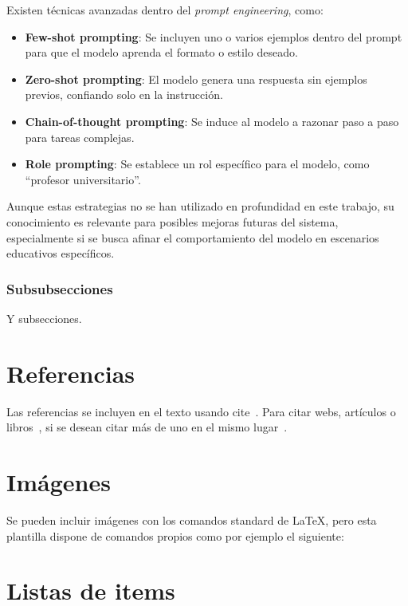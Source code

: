 Existen técnicas avanzadas dentro del \textit{prompt engineering}, como:

\begin{itemize}
    \item \textbf{Few-shot prompting}: Se incluyen uno o varios ejemplos dentro del prompt para 
	que el modelo aprenda el formato o estilo deseado.
    \item \textbf{Zero-shot prompting}: El modelo genera una respuesta sin ejemplos previos, 
	confiando solo en la instrucción.
    \item \textbf{Chain-of-thought prompting}: Se induce al modelo a razonar paso a paso para 
	tareas complejas.
    \item \textbf{Role prompting}: Se establece un rol específico para el modelo, como ``profesor universitario''.
\end{itemize}

Aunque estas estrategias no se han utilizado en profundidad en este trabajo, su conocimiento es relevante 
para posibles mejoras futuras del sistema, especialmente si se busca afinar el comportamiento del 
modelo en escenarios educativos específicos.


\subsubsection{Subsubsecciones}

Y subsecciones. 


\section{Referencias}

Las referencias se incluyen en el texto usando cite~\cite{wiki:latex}. Para citar webs, artículos o libros~\cite{koza92}, si se desean citar más de uno en el mismo lugar~\cite{bortolot2005, koza92}.


\section{Imágenes}

Se pueden incluir imágenes con los comandos standard de \LaTeX, pero esta plantilla dispone de comandos propios como por ejemplo el siguiente:




\section{Listas de items}


